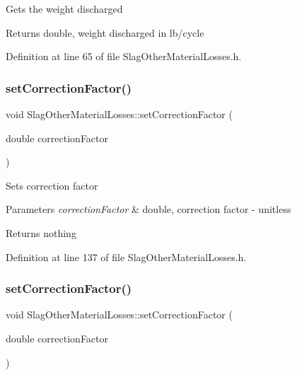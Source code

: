 Gets the weight discharged

\begin{DoxyReturn}{Returns}
double, weight discharged in lb/cycle 
\end{DoxyReturn}


Definition at line 65 of file Slag\+Other\+Material\+Losses.\+h.

\mbox{\label{class_slag_other_material_losses_a2aa985511888327bed6039da79c8958a}} 
\subsubsection{\texorpdfstring{set\+Correction\+Factor()}{setCorrectionFactor()}\hspace{0.1cm}{\footnotesize\ttfamily [1/3]}}
{\footnotesize\ttfamily void Slag\+Other\+Material\+Losses\+::set\+Correction\+Factor (\begin{DoxyParamCaption}\item[{double}]{correction\+Factor }\end{DoxyParamCaption})\hspace{0.3cm}{\ttfamily [inline]}}

Sets correction factor


\begin{DoxyParams}{Parameters}
{\em correction\+Factor} & double, correction factor -\/ unitless\\
\hline
\end{DoxyParams}
\begin{DoxyReturn}{Returns}
nothing 
\end{DoxyReturn}


Definition at line 137 of file Slag\+Other\+Material\+Losses.\+h.

\mbox{\label{class_slag_other_material_losses_a2aa985511888327bed6039da79c8958a}} 
\subsubsection{\texorpdfstring{set\+Correction\+Factor()}{setCorrectionFactor()}\hspace{0.1cm}{\footnotesize\ttfamily [2/3]}}
{\footnotesize\ttfamily void Slag\+Other\+Material\+Losses\+::set\+Correction\+Factor (\begin{DoxyParamCaption}\item[{double}]{correction\+Factor }\end{DoxyParamCaption})\hspace{0.3cm}{\ttfamily [inline]}}

